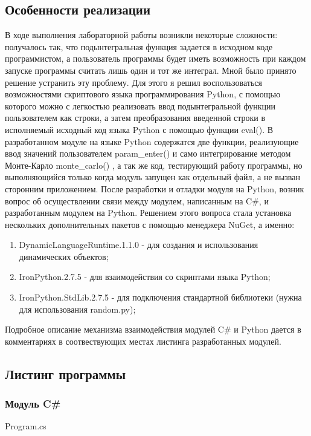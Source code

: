 \documentclass[russian,utf8,pointsection]{eskdtext}
\begin{document}
       	\subsection{Особенности реализации}
       	В ходе выполнения лабораторной работы возникли некоторые сложности: получалось так, что подынтегральная функция задается в исходном коде программистом, а пользователь программы будет иметь возможность при каждом запуске программы считать лишь один и тот же интеграл. Мной было принято решение устранить эту проблему. Для этого я решил воспользоваться возможностями скриптового языка программирования Python, с помощью которого можно с легкостью реализовать ввод подынтегральной функции пользователем как строки, а затем преобразования введенной строки в исполняемый исходный код языка Python с помощью функции eval(). 
       	В разработанном модуле на языке Python содержатся две функции, реализующие ввод значений пользователем  param\_enter()  и само интегрирование методом Монте-Карло  monte\_carlo() , а так же код, тестирующий работу программы, но выполняющийся только когда модуль запущен как отдельный файл, а не вызван сторонним приложением.
       	После разработки и отладки модуля на Python, возник вопрос об осуществлении связи между модулем, написанным на C\#, и разработанным модулем на Python. Решением этого вопроса стала установка нескольких дополнительных пакетов с помощью менеджера NuGet, а именно:
       	
       	\begin{enumerate}
       		\item DynamicLanguageRuntime.1.1.0 - для создания и использования динамических объектов;
       		\item IronPython.2.7.5 - для взаимодействия со скриптами языка Python;
       		\item IronPython.StdLib.2.7.5 - для подключения стандартной библиотеки (нужна для использования random.py);
       	\end{enumerate} 
       	
       	Подробное описание механизма взаимодействия модулей C\# и Python дается в комментариях в соотвествующих местах листинга разработанных модулей.
       	       			
       	\subsection{Листинг программы}
       
  \subsubsection{Модуль C\#}   
  
   {Program.cs}
   
\end{document}
